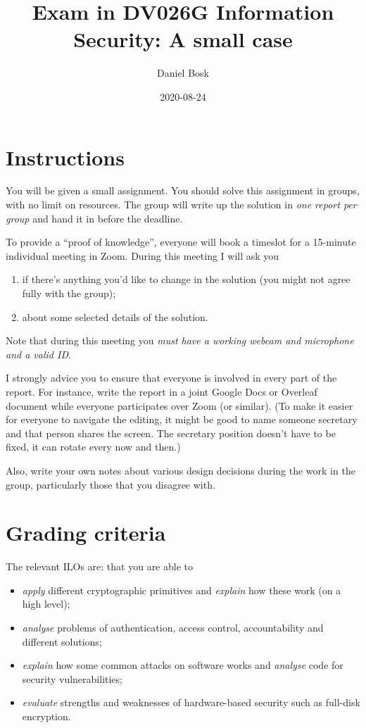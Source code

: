 \documentclass{article}
\title{Exam in DV026G Information Security: A small case}
\date{2020-08-24}
\author{%
  Daniel Bosk
}
\affil{%
  Department of Information Systems and Technology,\\
  Mid Sweden University, SE-851\,70 Sundsvall\\
  Email: \href{mailto:daniel.bosk@miun.se}{daniel.bosk@miun.se}\\
  Phone: 010-142\,8709
}
\begin{document}
\maketitle

\section*{Instructions}%
\label{sec:Instructions}
You will be given a small assignment.
You should solve this assignment in groups, with no limit on resources.
The group will write up the solution in \emph{one report per group} and hand it 
in before the deadline.

To provide a \enquote{proof of knowledge}, everyone will book a timeslot for a 
15-minute individual meeting in Zoom.
During this meeting I will ask you
\begin{enumerate}
  \item if there's anything you'd like to change in the solution (you might not 
    agree fully with the group);
  \item about some selected details of the solution.
\end{enumerate}
Note that during this meeting you \emph{must have a working webcam and 
microphone and a valid ID}.

I strongly advice you to ensure that everyone is involved in every part of the 
report.
For instance, write the report in a joint Google Docs or Overleaf document 
while everyone participates over Zoom (or similar).
(To make it easier for everyone to navigate the editing, it might be good to 
name someone secretary and that person shares the screen.
The secretary position doesn't have to be fixed, it can rotate every now and 
then.)

Also, write your own notes about various design decisions during the work in 
the group, particularly those that you disagree with.


\section*{Grading criteria}

The relevant \acp{ILO} are: that you are able to
\begin{itemize}
  \item \emph{apply} different cryptographic primitives and \emph{explain} how 
    these work (on a high level);

  \item \emph{analyse} problems of authentication, access control, 
    accountability and different solutions;

  \item \emph{explain} how some common attacks on software works and 
    \emph{analyse} code for security vulnerabilities;

  \item \emph{evaluate} strengths and weaknesses of hardware-based security 
    such as full-disk encryption.
\end{itemize}
\end{document}
